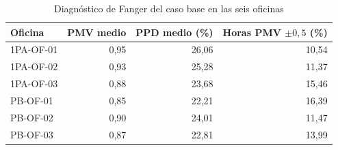 \begin{table}[htbp]\centering
\caption{Diagnóstico de Fanger del caso base en las seis oficinas}
{\small\singlespacing\begin{tabular}{lrrr}\toprule
Oficina & PMV medio & PPD medio (\%) & Horas PMV $\pm0,5$ (\%) \\ \midrule
1PA-OF-01 & 0,95 & 26,06 & 10,54 \\
1PA-OF-02 & 0,93 & 25,28 & 11,37 \\
1PA-OF-03 & 0,88 & 23,68 & 15,46 \\
PB-OF-01 & 0,85 & 22,21 & 16,39 \\
PB-OF-02 & 0,90 & 24,01 & 11,47 \\
PB-OF-03 & 0,87 & 22,81 & 13,99 \\
\bottomrule\end{tabular}}
\end{table}
